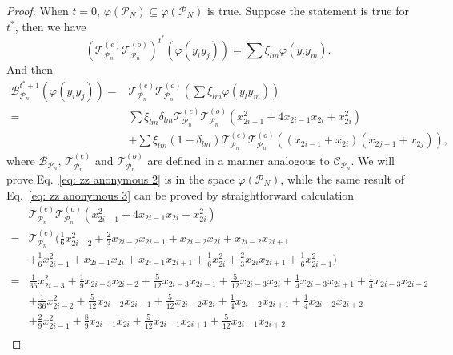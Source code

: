 \documentclass[showpacs,onecolumn,aps,prx,long bibliography,superscriptaddress,notitlepage]{revtex4-1}
\newcommand{\Tcal}{\mathcal{T}}
\begin{document}
\begin{proof}
     When $t=0$, $\varphi(\mathcal{P}_N)\subseteq \varphi(\mathcal{P}_N)$ is true.
     Suppose the statement is true for $t^*$, then we have
    \begin{equation}
        (\Tcal^{(e)}_{\mathcal{P}_n}\Tcal^{(o)}_{\mathcal{P}_n})^{t^*}(\varphi(y_iy_j)) = \sum \xi_{lm} \varphi(y_ly_m).
    \end{equation}
    And then
    \begin{align}
        \mathcal{B}_{\mathcal{P}_n}  ^{t^*+1}(\varphi(y_i y_j)) =& 
        \Tcal^{(e)}_{\mathcal{P}_n}\Tcal^{(o)}_{\mathcal{P}_n} (\sum \xi_{lm} \varphi(y_ly_m)) \\
        \label{eq: zz anonymous 2}
        =& \sum \xi_{lm} \delta_{lm}\Tcal^{(e)}_{\mathcal{P}_n}\Tcal^{(o)}_{\mathcal{P}_n} ( x_{2i-1}^2+4 x_{2i-1} x_{2i}+x_{2i}^2) \\
        \label{eq: zz anonymous 3}
        & + \sum \xi_{lm} (1-\delta_{lm})\Tcal^{(e)}_{\mathcal{P}_n}\Tcal^{(o)}_{\mathcal{P}_n}\left(\left(x_{2 i-1}+x_{2 i}\right)\left(x_{2 j-1}+x_{2 j}\right)\right),
    \end{align}
    where $\mathcal{B}_{\mathcal{P}_n}$,  $\Tcal^{(e)}_{\mathcal{P}_n}$ and $\Tcal^{(o)}_{\mathcal{P}_n}$ are defined in a manner analogous to $\mathcal{C}_{\mathcal{P}_n}$. 
    We will prove Eq.~\eqref{eq: zz anonymous 2} is in the space $\varphi(\mathcal{P}_N)$, while the same result of Eq.~\eqref{eq: zz anonymous 3} can be proved by straightforward calculation
    \begin{equation}
    \begin{aligned}
        \label{eq: zz anonymous 4}
        &\Tcal^{(e)}_{\mathcal{P}_n}\Tcal^{(o)}_{\mathcal{P}_n} ( x_{2i-1}^2+4 x_{2i-1} x_{2i}+x_{2i}^2) \\
        =& \Tcal^{(e)}_{\mathcal{P}_n}(\frac{1}{6}x_{2i-2}^2 + \frac{2}{3} x_{2i-2}x_{2i-1} + x_{2i-2}x_{2i}+x_{2i-2}x_{2i+1} \\
        &+\frac{1}{6} x_{2i-1}^2 + x_{2i-1}x_{2i} + x_{2i-1}x_{2i+1} +\frac{1}{6} x_{2i}^2 + \frac{2}{3} x_{2i}x_{2i+1} + \frac{1}{6}x_{2i+1}^2  )\\
        =& \frac{1}{36}x_{2i-3}^2 + \frac{1}{9} x_{2i-3}x_{2i-2} +\frac{5}{12} x_{2i-3}x_{2i-1}+ \frac{5}{12} x_{2i-3}x_{2i}  + \frac{1}{4} x_{2i-3}x_{2i+1} + \frac{1}{4} x_{2i-3}x_{2i+2}  \\
        &+ \frac{1}{36}x_{2i-2}^2 + \frac{5}{12} x_{2i-2}x_{2i-1}+ \frac{5}{12} x_{2i-2}x_{2i}  + \frac{1}{4} x_{2i-2}x_{2i+1} + \frac{1}{4} x_{2i-2}x_{2i+2}  \\
        &+ \frac{2}{9}x_{2i-1}^2 + \frac{8}{9} x_{2i-1}x_{2i} + \frac{5}{12} x_{2i-1}x_{2i+1} + \frac{5}{12} x_{2i-1}x_{2i+2}\\

\end{aligned}
\end{equation}
\end{proof}
\end{document}
